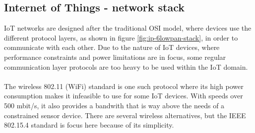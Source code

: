 \subsection{Internet of Things - network stack}


IoT networks are designed after the traditional OSI model, where devices use the different protocol layers, as shown in figure \ref{fig:ip-6lowpan-stack}, in order to communicate with each other. 
Due to the nature of IoT devices, where performance constraints and power limitations are in focus, some regular communication layer protocols are too heavy to be used within the IoT domain.
\\\\
The wireless 802.11 (WiFi) standard is one such protocol where its high power consumption makes it infeasible to use for some IoT devices. With speeds over 500 mbit/s, it also provides a bandwith that is way above the needs of a constrained sensor device. There are several wireless alternatives, but the IEEE 802.15.4 standard is focus here because of its simplicity.


